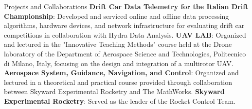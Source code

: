 \begin{rubric}{Projects and Collaborations}
\entry*[2021 -- 2023] \textbf{Drift Car Data Telemetry for the Italian Drift Championship}: Developed and serviced online and offline data processing algorithms, hardware devices, and network infrastructure for evaluating drift car competitions in collaboration with Hydra Data Analysis.
%
\entry*[2018 - 2019] \textbf{UAV LAB}: Organized and lectured in the "Innovative Teaching Methods" course held at the Drone laboratory of the Department of Aerospace Science and Technologies, Politecnico di Milano, Italy, focusing on the design and integration of a multirotor UAV.
%
%
%
\entry*[2014] \textbf{Aerospace System, Guidance, Navigation, and Control}: Organized and lectured in a theoretical and practical course provided through collaboration between Skyward Experimental Rocketry and The MathWorks.
%
\entry*[2013 -- 2015] \textbf{Skyward Experimental Rocketry}: Served as the leader of the Rocket Control Team.
\end{rubric}

